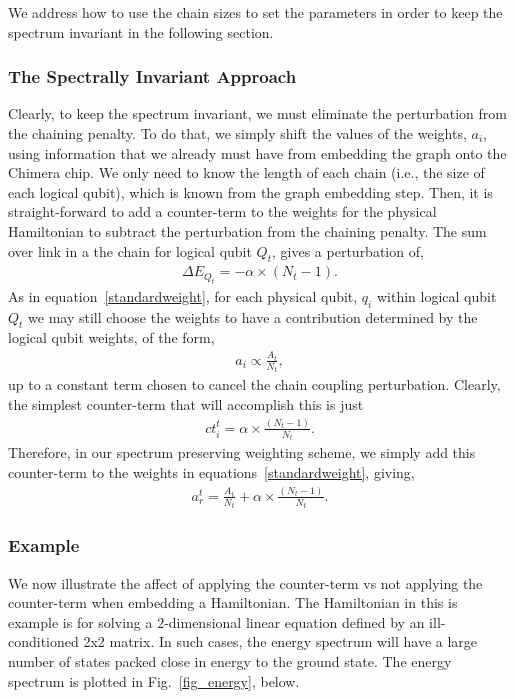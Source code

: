 \documentclass[preprint,12pt,eqsecnum,nofootinbib,amsmath,amssymb]{revtex4}
\begin{document}
We address how to use the chain sizes to set the parameters in order to keep the spectrum invariant 
in the following section.


\subsubsection{The Spectrally Invariant Approach}
Clearly, to keep the spectrum invariant, we must eliminate the perturbation from the
chaining penalty.
To do that, we simply shift the values of the weights, $a_i$, using information that we 
already must have from embedding the graph onto the Chimera chip. We only need to know
the length of each chain (i.e., the size of each logical qubit), which is known from 
the graph embedding step. Then, it is straight-forward to add a counter-term to the weights 
for the physical Hamiltonian to subtract the perturbation from the chaining penalty.
The sum over link in a the chain for logical qubit $Q_t$, gives a perturbation of,
%
\begin{eqnarray}
  \Delta E_{Q_t} = -\alpha \times (N_t-1). 
  \label{qperturbation}  
\end{eqnarray}
%
As in equation~\ref{standardweight}, for each physical qubit, $q_i$ within logical qubit $Q_t$ 
we may still choose the weights to have a contribution determined by the
logical qubit weights, of the form,
%
\begin{eqnarray}
  a_i \propto \frac{A_t}{N_t},
\end{eqnarray}
%
up to a constant term chosen to cancel the chain coupling perturbation.  Clearly, the
simplest counter-term that will accomplish this is just
%
\begin{eqnarray}
  ct_i^t = \alpha \times \frac{(N_t-1)}{N_t}.
\end{eqnarray}
%
Therefore, in our spectrum preserving weighting scheme, we simply add this counter-term to the weights 
in equations~\ref{standardweight}, giving,
%
\begin{eqnarray}
  a^t_r = \frac{A_t}{N_t} + \alpha \times \frac{(N_t-1)}{N_t}.
  \label{newweight}
\end{eqnarray}

\subsubsection{Example}
We now illustrate the affect of applying the counter-term vs not applying the counter-term when embedding
a Hamiltonian. The Hamiltonian in this is example is for solving a $2$-dimensional linear equation defined by
an ill-conditioned 2x2 matrix. In such cases, the energy spectrum will have a large number of states packed
close in energy to the ground state. The energy spectrum is plotted in Fig.~\ref{fig_energy}, below.
\end{document}
